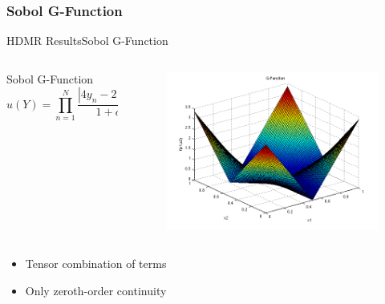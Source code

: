 \documentclass{beamer}
\begin{document}
\subsubsection{Sobol G-Function}
\begin{frame}{HDMR Results}{Sobol G-Function}\vspace{-20pt}
  \begin{columns}
    \begin{column}{0.65\textwidth}
      \begin{block}{Sobol G-Function}
        \[u(Y) = \prod_{n=1}^N \frac{|4y_n-2|-a_n}{1+a_n},\hspace{10pt}a_n=\frac{n-2}{2}\]
      \end{block}
    \end{column}
    \begin{column}{0.35\textwidth}
        \begin{figure}[h!]
          \centering
          \includegraphics[width=\linewidth]{anlmodels/gfunc}
        \end{figure}
    \end{column}
  \end{columns}
  \begin{itemize}
    \item Tensor combination of terms
    \item Only zeroth-order continuity
  \end{itemize}
\end{frame}
\end{document}
